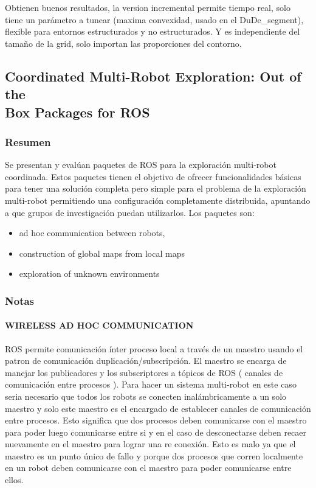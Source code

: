 Obtienen buenos resultados, la version incremental permite tiempo real, solo tiene un parámetro a tunear (maxima convexidad, usado en el DuDe\_segment), flexible para entornos estructurados y no estructurados. Y es independiente del tamaño de la grid, solo importan las proporciones del contorno.

\subsection[Coordinated Multi-Robot Exploration: Out of the Box Packages for ROS]{Coordinated Multi-Robot Exploration: Out of the\\ Box Packages for ROS}
\subsubsection{Resumen}
Se presentan y evalúan paquetes de ROS para la exploración multi-robot coordinada. Estos paquetes tienen el objetivo de ofrecer funcionalidades básicas para tener una solución completa pero simple para el problema de la exploración multi-robot permitiendo una configuración completamente distribuida, apuntando a que grupos de investigación puedan utilizarlos. Los paquetes son:
\begin{itemize}
  \item ad hoc communication between robots,
  \item construction of global maps from local maps
  \item exploration of unknown environments
\end{itemize}

\subsubsection{Notas}
\paragraph{WIRELESS AD HOC COMMUNICATION}

ROS permite comunicación ínter proceso local a través de un maestro usando el patron de comunicación duplicación/subscripción. El maestro se encarga de manejar los publicadores y los subscriptores a  tópicos de ROS ( canales de comunicación entre procesos ). Para hacer un sistema multi-robot en este caso seria necesario que todos los robots se conecten inalámbricamente a un solo maestro y solo este maestro es el encargado de establecer canales de comunicación entre procesos. Esto significa que dos procesos deben comunicarse con el maestro para poder luego comunicarse entre si y en el caso de desconectarse deben recaer nuevamente en el maestro para lograr una re conexión. Esto es malo ya que el maestro es un punto único de fallo y porque dos procesos que corren localmente en un robot deben comunicarse con el maestro para poder comunicarse entre ellos.

